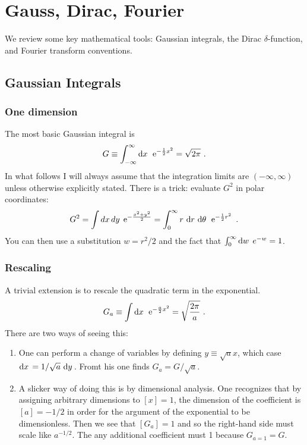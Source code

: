\documentclass[12pt, oneside]{report}    %
\let\oldsection\section
\def\section{%
  \setcounter{sidenote}{1}%
  \oldsection
}
\begin{document}

\chapter{Gauss, Dirac, Fourier}
\label{app:gauss:dirac:fourier}

We review some key mathematical tools: Gaussian integrals, the Dirac $\delta$-function, and Fourier transform conventions. 

\section{Gaussian Integrals }
\subsection{One dimension}
The most basic Gaussian integral is 
\begin{align}
    G \equiv \int_{-\infty}^\infty \operatorname{d}\mkern-3mu^{}\mkern-1mu{x}\,\; \operatorname{e}^{-\frac{1}{2}x^2} = \sqrt{2\pi} \ .
\end{align}
In what follows I will always assume that the integration limits are $(-\infty, \infty)$ unless otherwise explicitly stated. There is a trick: evaluate $G^2$ in polar coordinates:
\begin{align}
    G^2 = \int dx\,dy\;  \operatorname{e}^{-\frac{x^2+y^2}{2}}
    = \int_0^\infty r\,\operatorname{d}\mkern-3mu^{}\mkern-1mu{r}\,\operatorname{d}\mkern-3mu^{}\mkern-1mu{\theta}\,\;  \operatorname{e}^{-\frac{1}{2}r^2} \ .
\end{align}
You can then use a substitution $w = r^2/2$ and the fact that $\int_0^\infty \operatorname{d}\mkern-3mu^{}\mkern-1mu{w}\,\; e^{-w} = 1$. 

\subsection{Rescaling}

A trivial extension is to rescale the quadratic term in the exponential.
\begin{align}
    G_a \equiv \int \operatorname{d}\mkern-3mu^{}\mkern-1mu{x}\,\; \operatorname{e}^{-\frac{a}{2}x^2} = \sqrt{\frac{2\pi}{a}} \ .
\end{align}
There are two ways of seeing this:
\begin{enumerate}
    \item One can perform a change of variables by defining $y\equiv \sqrt{a} x$, which case $\operatorname{d}\mkern-3mu^{}\mkern-1mu{x}\, = 1/\sqrt{a}\, \operatorname{d}\mkern-3mu^{}\mkern-1mu{y}\,$. Fromt his one finds $G_a = G/\sqrt{a}$.
    \item A slicker way of doing this is by dimensional analysis. One recognizes that by assigning arbitrary dimensions to  $[x] = 1$, the dimension of the coefficient is $[a]=-1/2$ in order for the argument of the exponential to be dimensionless. Then we see that $[G_a] = 1$ and so the right-hand side must scale like $a^{-1/2}$. The any additional coefficient must 1 because $G_{a=1}=G$.
\end{enumerate}
\end{document}
